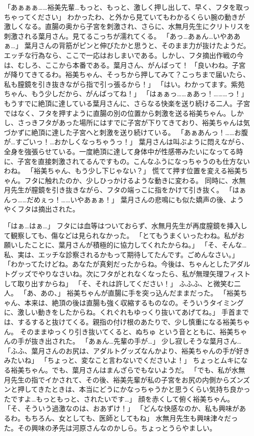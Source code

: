 「あぁぁぁ……裕美先輩…もっと、もっと、激しく押し出して、早く、フタを取っちゃってください」
わかったわ、と外から見ていてもわかるくらい腕の動きが激しくなる。直腸の奥から子宮を刺激され、さらに、水無月先生にクリトリスを刺激される葉月さん。見てるこっちが濡れてくる。
「あっ…あぁん…いやああぁ…」
葉月さんの背筋がピンと伸びたかと思うと、そのまま力が抜けたようだ。エッチな行為なら、ここで一応はおしまいである。しかし、フタ摘出作戦の今は、むしろ、ここから本番である。葉月さん、がんばって！
「良いわね。子宮が降りてきてるわ。裕美ちゃん、そっちから押してみて？こっちまで届いたら、私も膣鏡を引き抜きながら指で引っ張るから！」
「はい。わかってます。紫苑ちゃん、もう少しだから、がんばってね！」
「はぁぁっ……ぁあっ！………っ！」
もうすでに絶頂に達している葉月さんに、さらなる快楽を送り続ける二人。子宮ではなく、フタを押すように直腸の別の位置から刺激を送る裕美ちゃん。しかし、さっきフタがあった場所にはすでに子宮が下りてきており、裕美ちゃんは気づかずに絶頂に達した子宮へと刺激を送り続けている。
「あぁあんっ！……お腹が…すごいっ！…おかしくなっちゃうっ！」
葉月さんは叫ぶように悶えながら、全身を強張らせている。一度絶頂に達して身体中が性感帯みたいになってる時に、子宮を直接刺激されてるんですもの。こんなふうになっちゃうのも仕方ないわね。
「裕美ちゃん、もう少し下じゃない？」
慌てて押す位置を変える裕美ちゃん。フタに触れたのか、少しひっかけるような動きに変わる。
同時に、水無月先生が膣鏡を引き抜きながら、フタの端っこに指をかけて引き抜く。
「はぁんっ……だめぇっ！……いやあぁぁ！」
葉月さんの悲鳴にも似た嬌声の後、ようやくフタは摘出された。

「はぁ…はぁ…」
フタには血等はついておらず、水無月先生が再度膣鏡を挿入して観察しても、傷などは見られなかった。
「とてもうまくいったわね。私がお願いしたことに、葉月さんが積極的に協力してくれたからね。」
「そ、そんな…私、実は、エッチな診察されるかもって期待してたんです。ごめんなさい。」
「わかってたけどね。あなたが真剣だったからね。今後は、ちゃんとしたアダルトグッズでやりなさいね。次にフタがとれなくなったら、私が無理矢理フィストして取り出すからね」
「そ、それは許してください！」
ふふふ、と微笑む二人。
「あ、あの、」
裕美ちゃんが直腸に手を突っ込んだままだった。
「裕美ちゃん、本来は、絶頂の後は直腸も強く収縮するものなの。そういうタイミングに、激しい動きをしたからね。くれぐれもゆっくり抜いてあげてね。」
手首までは、するすると抜けてくる。親指の付け根のあたりで、少し慎重になる裕美ちゃん。
そのままゆっくり引き抜いてくると、ぬちゅ という音とともに、裕美ちゃんの手が抜き出された。
「あぁん…先輩の手が…」
少し寂しそうな葉月さん…
「ふふ、葉月さんのお尻は、アダルトグッズなんかより、裕美ちゃんの手が好きみたいね」
「ちょっと、変なこと言わないでくださいよ！」
ちょっとムキになる裕美ちゃん。でも、葉月さんはまんざらでもないようだ。
「でも、私が水無月先生の指でイかされて、その後、裕美先輩が私の子宮をお尻の内側からズンズンと押してきたときは、本当にどうにかなっちゃうかと思うくらい気持ち良かったですよ…もっともっと、されたいです…」
顔を赤くして俯く裕美ちゃん。
「そ、そういう過激なのは、おあずけ！」
「どんな快感なのか、私も興味があるわ。もちろん、女としても、医師としてもね」
水無月先生も興味津々だった。その興味の矛先は河原さんなのかしら。ちょっとうらやましい。

